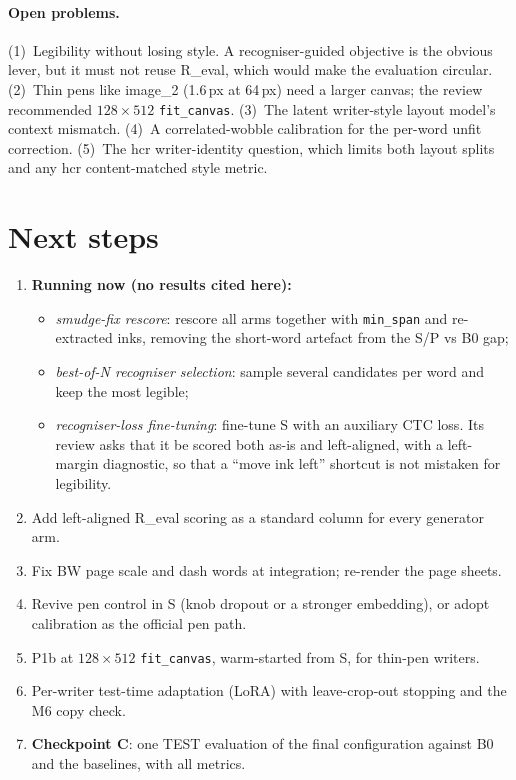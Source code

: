 \documentclass[10.5pt,a4paper]{article}
\begin{document}
\paragraph{Open problems.} (1)~Legibility without losing style. A recogniser-guided objective is the obvious lever, but it
must not reuse R\_eval, which would make the evaluation circular. (2)~Thin pens like image\_2 (1.6\,px at 64\,px) need a
larger canvas; the review recommended $128\times512$ \texttt{fit\_canvas}. (3)~The latent writer-style layout model's context
mismatch. (4)~A correlated-wobble calibration for the per-word unfit correction. (5)~The hcr writer-identity question, which
limits both layout splits and any hcr content-matched style metric.

\section{Next steps}
\label{sec:next}
\begin{enumerate}
\item \textbf{Running now (no results cited here):}
  \begin{itemize}
  \item \emph{smudge-fix rescore}: rescore all arms together with \texttt{min\_span} and re-extracted inks, removing the
    short-word artefact from the S/P vs B0 gap;
  \item \emph{best-of-N recogniser selection}: sample several candidates per word and keep the most legible;
  \item \emph{recogniser-loss fine-tuning}: fine-tune S with an auxiliary CTC loss. Its review asks that it be scored both
    as-is and left-aligned, with a left-margin diagnostic, so that a ``move ink left'' shortcut is not mistaken for legibility.
  \end{itemize}
\item Add left-aligned R\_eval scoring as a standard column for every generator arm.
\item Fix BW page scale and dash words at integration; re-render the page sheets.
\item Revive pen control in S (knob dropout or a stronger embedding), or adopt calibration as the official pen path.
\item P1b at $128\times512$ \texttt{fit\_canvas}, warm-started from S, for thin-pen writers.
\item Per-writer test-time adaptation (LoRA) with leave-crop-out stopping and the M6 copy check.
\item \textbf{Checkpoint C}: one TEST evaluation of the final configuration against B0 and the baselines, with all metrics.
\end{enumerate}
\end{document}
